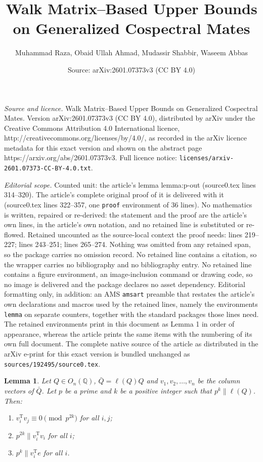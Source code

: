\documentclass[10pt,a4paper]{amsart}
\title{Walk Matrix–Based Upper Bounds on Generalized Cospectral Mates}
\author{Muhammad Raza, Obaid Ullah Ahmad, Mudassir Shabbir, Waseem Abbas}
\date{Source: arXiv:2601.07373v3 (CC BY 4.0)}
\newtheorem{lemma}{Lemma}
\newcommand{\trans}{^{\mathrm{T}}}
\begin{document}
\maketitle

\noindent\emph{Source and licence.} Walk Matrix–Based Upper Bounds on Generalized Cospectral Mates. Version arXiv:2601.07373v3 (CC BY 4.0), distributed by arXiv under the Creative Commons Attribution 4.0 International licence, http://creativecommons.org/licenses/by/4.0/, as recorded in the arXiv licence metadata for this exact version and shown on the abstract page https://arxiv.org/abs/2601.07373v3. Full licence notice: \texttt{licenses/arxiv-2601.07373-CC-BY-4.0.txt}.\par\smallskip

\noindent\textit{Editorial scope.} Counted unit: the article's lemma lemma:p-out (source0.tex lines 314--320). The article's complete original proof of it is delivered with it (source0.tex lines 322--357, one \texttt{proof} environment of 36 lines). No mathematics is written, repaired or re-derived: the statement and the proof are the article's own lines, in the article's own notation, and no retained line is substituted or re-flowed.  Retained uncounted as the source-local context the proof needs: lines 219--227; lines 243--251; lines 265--274.  Nothing was omitted from any retained span, so the package carries no omission record.  No retained line contains a citation, so the wrapper carries no bibliography and no bibliography entry.  No retained line contains a figure environment, an image-inclusion command or drawing code, so no image is delivered and the package declares no asset dependency.  Editorial formatting only, in addition: an AMS \texttt{amsart} preamble that restates the article's own declarations and macros used by the retained lines, namely the environments \texttt{lemma} on separate counters, together with the standard packages those lines need.  The retained environments print in this document as Lemma 1 in order of appearance, whereas the article prints the same items with the numbering of its own full document.  The complete native source of the article as distributed in the arXiv e-print for this exact version is bundled unchanged as \texttt{sources/192495/source0.tex}.
\begin{lemma}
\label{lemma:q-props}
Let $Q \in O_n(\mathbb{Q})$, $\bar{Q} = \ell(Q)Q$ and $v_1, v_2, \dots, v_n$ be the column vectors of $\bar{Q}$. Let $p$ be a prime and $k$ be a positive integer such that $p^k \parallel \ell(Q)$. Then:
\begin{enumerate}
\item $v_i\trans v_j \equiv 0 \pmod{p^{2k}}$ for all $i, j$;
\item $p^{2k} \parallel v_i\trans v_i$ for all $i$;
\item $p^{k} \parallel v_i\trans e$ for all $i$.
\end{enumerate} 
\end{lemma}
\end{document}

